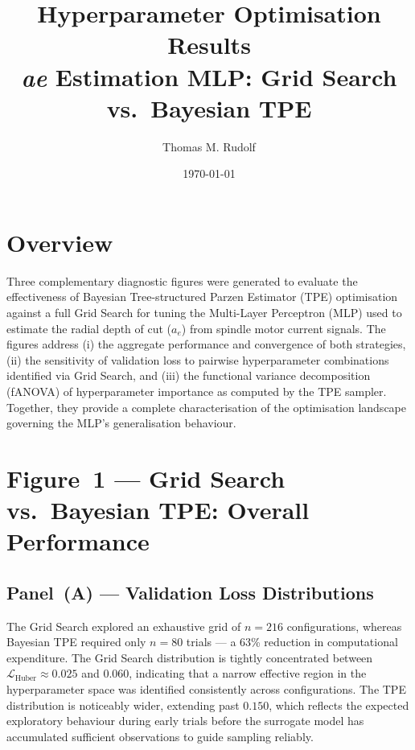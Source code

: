 \documentclass[11pt, a4paper]{article}
\newcommand{\Lhuber}{\mathcal{L}_{\text{Huber}}}
\newcommand{\ae}{a_e}
\begin{document}
\title{\textbf{Hyperparameter Optimisation Results}\\[4pt]
       \large \textit{ae} Estimation MLP: Grid Search vs.\ Bayesian TPE}
\author{Thomas M. Rudolf}
\date{\today}
\maketitle
\tableofcontents
\bigskip

\section{Overview}
\label{sec:overview}

Three complementary diagnostic figures were generated to evaluate the effectiveness
of Bayesian Tree-structured Parzen Estimator (TPE) optimisation against a full
Grid Search for tuning the Multi-Layer Perceptron (MLP) used to estimate the radial
depth of cut ($\ae$) from spindle motor current signals.
The figures address (i) the aggregate performance and convergence of both strategies,
(ii) the sensitivity of validation loss to pairwise hyperparameter combinations
identified via Grid Search, and (iii) the functional variance decomposition (fANOVA)
of hyperparameter importance as computed by the TPE sampler.
Together, they provide a complete characterisation of the optimisation landscape
governing the MLP's generalisation behaviour.

\section{Figure~1 — Grid Search vs.\ Bayesian TPE: Overall Performance}
\label{sec:fig1}

\subsection{Panel~(A) — Validation Loss Distributions}
\label{sec:fig1a}

The Grid Search explored an exhaustive grid of $n = 216$ configurations, whereas
Bayesian TPE required only $n = 80$ trials — a 63\% reduction in computational
expenditure.
The Grid Search distribution is tightly concentrated between
$\Lhuber \approx 0.025$ and $0.060$, indicating that a narrow effective region in
the hyperparameter space was identified consistently across configurations.
The TPE distribution is noticeably wider, extending past $0.150$, which reflects
the expected exploratory behaviour during early trials before the surrogate model
has accumulated sufficient observations to guide sampling reliably.
\end{document}
